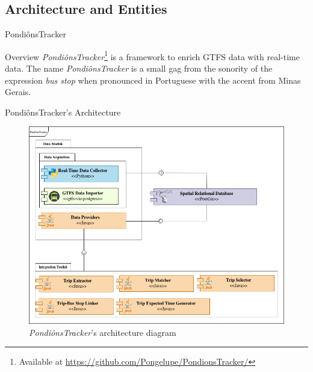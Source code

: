 \documentclass[xcolor=dvipsnames,table]{beamer}
\begin{document}
\subsection{Architecture and Entities}
\begin{frame}{PondiônsTracker}
        \begin{block}{Overview}
                \textit{PondiônsTracker}\footnote{Available at \url{https://github.com/Pongelupe/PondionsTracker/}} 
                is a framework to enrich
                GTFS data with real-time data. 
                The name \textit{PondiônsTracker} is a small gag from the sonority of the expression{ \em bus stop}
                when pronounced in Portuguese with the accent from Minas Gerais.
        \end{block}
\end{frame}
\begin{frame}{PondiônsTracker's Architecture}
        \begin{figure}[H]
                \centering
                \includegraphics[scale=0.3]{images/arq-pondionstracker.drawio.png}
                \caption{\textit{PondiônsTracker}'s architecture diagram}
        \end{figure}
\end{frame}
\end{document}
